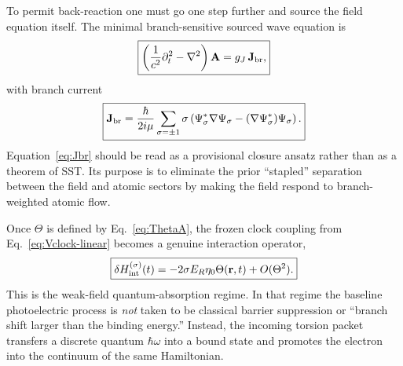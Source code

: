 \documentclass[11pt,a4paper]{article}
\begin{document}
To permit back-reaction one must go one step further and source the field equation itself. The minimal branch-sensitive sourced wave equation is
\begin{equation}
\label{eq:Awave-source}
\boxed{
\left(\frac{1}{c^2}\partial_t^2-\nabla^2\right)\mathbf A
=
g_J \,\mathbf J_{\rm br},
}
\end{equation}
with branch current
\begin{equation}
\label{eq:Jbr}
\boxed{
\mathbf J_{\rm br}
=
\frac{\hbar}{2 i \mu}
\sum_{\sigma=\pm 1}
\sigma
\left(
\Psi_\sigma^*\nabla\Psi_\sigma
-
(\nabla\Psi_\sigma^*)\Psi_\sigma
\right).
}
\end{equation}
Equation~\eqref{eq:Jbr} should be read as a provisional closure ansatz rather than as a theorem of SST. Its purpose is to eliminate the prior ``stapled'' separation between the field and atomic sectors by making the field respond to branch-weighted atomic flow.

Once $\Theta$ is defined by Eq.~\eqref{eq:ThetaA}, the frozen clock coupling from Eq.~\eqref{eq:Vclock-linear} becomes a genuine interaction operator,
\begin{equation}
\label{eq:HintTheta}
\boxed{
\delta H_{\rm int}^{(\sigma)}(t)
=
-2\sigma E_R\eta_0\Theta(\mathbf r,t)
+O(\Theta^2).
}
\end{equation}
This is the weak-field quantum-absorption regime. In that regime the baseline photoelectric process is \emph{not} taken to be classical barrier suppression or ``branch shift larger than the binding energy.'' Instead, the incoming torsion packet transfers a discrete quantum $\hbar\omega$ into a bound state and promotes the electron into the continuum of the same Hamiltonian.
\end{document}
